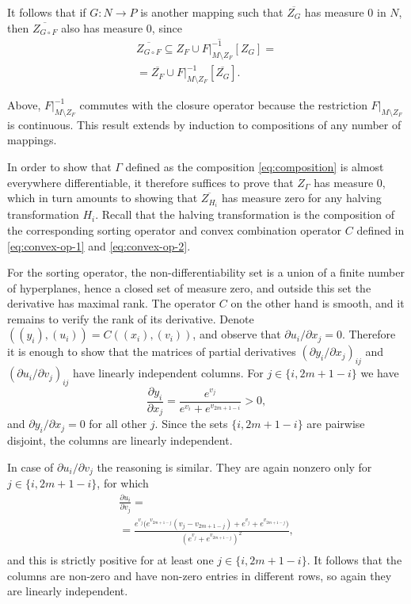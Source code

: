 \documentclass{article}
\begin{document}
It follows that if $G\colon N\to P$ is another mapping such that $\overline{Z_G}$ has measure $0$ in $N$, then $\overline{Z_{G\circ F}}$ also has measure 0, since
\begin{multline}
    \overline{Z_{G\circ F}} \subseteq \overline{Z_F \cup F|_{M\setminus Z_F}^{-1}[Z_G]} =\\=\overline{Z_F} \cup F|_{M\setminus Z_F}^{-1}[\overline{Z_G}].
\end{multline}

Above, $F|_{M\setminus Z_F}^{-1}$ commutes with the closure operator because the restriction $F|_{M\setminus Z_F}$ is continuous. This result extends by induction to compositions of any number of mappings.

In order to show that $\Gamma$ defined as the composition \eqref{eq:composition} is almost everywhere differentiable, it therefore suffices to prove that $Z_{\Gamma}$ has measure 0, which in turn amounts to showing that $\overline{Z_{H_i}}$ has measure zero for any halving transformation $H_i$. Recall that the halving transformation is the composition of the corresponding sorting operator and convex combination operator $C$ defined in \eqref{eq:convex-op-1} and \eqref{eq:convex-op-2}. 

For the sorting operator, the non-differentiability set is a union of a finite number of hyperplanes, hence a closed set of measure zero, and outside this set the derivative has maximal rank. The operator $C$ on the other hand is smooth, and it remains to verify the rank of its derivative. Denote \(((y_{i}), (u_{i})) = C((x_{i}), (v_{i}))\), and observe that \(\partial u_{i}/\partial x_{j} = 0\). Therefore it is enough to show that the matrices of partial derivatives \((\partial y_{i}/\partial x_{j})_{ij}\) and \((\partial u_{i}/\partial v_{j})_{ij}\) have linearly independent columns.
For \(j\in\{i, 2m+1-i\}\) we have
\begin{equation}
  \frac{\partial y_{i}}{\partial x_{j}} = \frac{e^{v_{j}}}{e^{v_{i}} + e^{v_{2m+1-i}}} > 0,
\end{equation}
and \({\partial y_{i}}/{\partial x_{j}}=0\) for all other \(j\). Since the sets \(\{i, 2m+1-i\}\) are pairwise disjoint, the columns are linearly independent.

In case of \(\partial u_{i}/\partial v_{j}\) the reasoning is similar. They are again nonzero only for  \(j\in\{i, 2m+1-i\}\), for which
\begin{multline}
  \frac{\partial u_{i}}{\partial v_{j}} =\\=\frac{e^{v_{j}}\bigl( e^{v_{2m+1-j}}(v_{j}-v_{2m+1-j}) + e^{v_{j}} + e^{v_{2m+1-j}} \bigr)}{(e^{v_{j}}+e^{v_{2m+1-j}})^{2}} ,\\
\end{multline}
and this is strictly positive for at least one \(j\in\{i, 2m+1-i\}\). It follows that the columns are non-zero and have non-zero entries in different rows, so again they are linearly independent.
\end{document}
